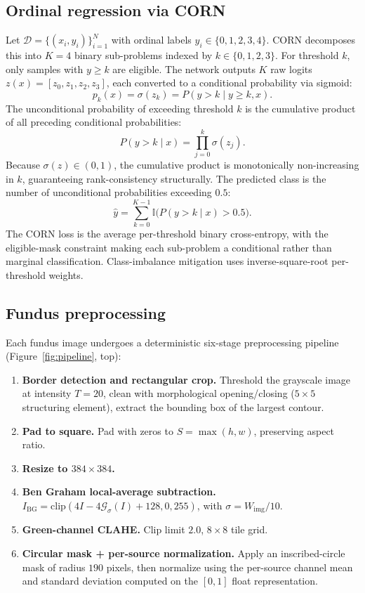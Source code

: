 \documentclass[11pt,a4paper]{article}
\begin{document}
\subsection{Ordinal regression via CORN}

Let $\mathcal{D} = \{(x_i, y_i)\}_{i=1}^N$ with ordinal labels $y_i \in \{0,1,2,3,4\}$. CORN decomposes this into $K = 4$ binary sub-problems indexed by $k \in \{0,1,2,3\}$. For threshold $k$, only samples with $y \ge k$ are eligible. The network outputs $K$ raw logits $z(x) = [z_0, z_1, z_2, z_3]$, each converted to a conditional probability via sigmoid:
\begin{equation}
p_k(x) = \sigma(z_k) = P(y > k \mid y \ge k, x).
\end{equation}
The unconditional probability of exceeding threshold $k$ is the cumulative product of all preceding conditional probabilities:
\begin{equation}
P(y > k \mid x) = \prod_{j=0}^{k} \sigma(z_j).
\end{equation}
Because $\sigma(z) \in (0,1)$, the cumulative product is monotonically non-increasing in $k$, guaranteeing rank-consistency structurally. The predicted class is the number of unconditional probabilities exceeding $0.5$:
\begin{equation}
\hat{y} = \sum_{k=0}^{K-1} \mathbb{I}\bigl(P(y > k \mid x) > 0.5\bigr).
\end{equation}
The CORN loss is the average per-threshold binary cross-entropy, with the eligible-mask constraint making each sub-problem a conditional rather than marginal classification. Class-imbalance mitigation uses inverse-square-root per-threshold weights.

\subsection{Fundus preprocessing}

Each fundus image undergoes a deterministic six-stage preprocessing pipeline (Figure~\ref{fig:pipeline}, top):
\begin{enumerate}
  \item \textbf{Border detection and rectangular crop.} Threshold the grayscale image at intensity $T = 20$, clean with morphological opening/closing ($5 \times 5$ structuring element), extract the bounding box of the largest contour.
  \item \textbf{Pad to square.} Pad with zeros to $S = \max(h, w)$, preserving aspect ratio.
  \item \textbf{Resize to $384 \times 384$.}
  \item \textbf{Ben Graham local-average subtraction.} $I_{\text{BG}} = \mathrm{clip}(4 I - 4 \mathcal{G}_\sigma(I) + 128, 0, 255)$, with $\sigma = W_{\mathrm{img}}/10$.
  \item \textbf{Green-channel CLAHE.} Clip limit $2.0$, $8 \times 8$ tile grid.
  \item \textbf{Circular mask + per-source normalization.} Apply an inscribed-circle mask of radius $190$ pixels, then normalize using the per-source channel mean and standard deviation computed on the $[0,1]$ float representation.
\end{enumerate}
\end{document}
